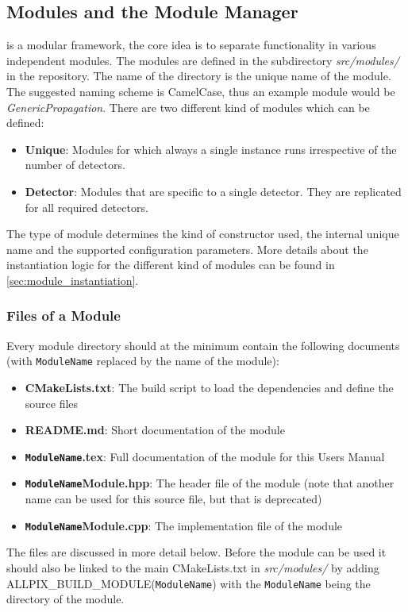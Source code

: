 \subsection{Modules and the Module Manager}
\label{sec:module_manager}
\apsq is a modular framework, the core idea is to separate functionality in various independent modules. The modules are defined in the subdirectory \textit{src/modules/} in the repository. The name of the directory is the unique name of the module. The suggested naming scheme is CamelCase, thus an example module would be \textit{GenericPropagation}. There are two different kind of modules which can be defined:
\begin{itemize}
\item \textbf{Unique}: Modules for which always a single instance runs irrespective of the number of detectors.
\item \textbf{Detector}: Modules that are specific to a single detector. They are replicated for all required detectors.
\end{itemize}
The type of module determines the kind of constructor used, the internal unique name and the supported configuration parameters. More details about the instantiation logic for the different kind of modules can be found in \ref{sec:module_instantiation}.

\subsubsection{Files of a Module}
\label{sec:module_files}
Every module directory should at the minimum contain the following documents (with \texttt{ModuleName} replaced by the name of the module):
\begin{itemize}
\item \textbf{CMakeLists.txt}: The build script to load the dependencies and define the source files
\item \textbf{README.md}: Short documentation of the module
\item \textbf{\texttt{ModuleName}.tex}: Full documentation of the module for this Users Manual
\item \textbf{\texttt{ModuleName}Module.hpp}: The header file of the module (note that another name can be used for this source file, but that is deprecated)
\item \textbf{\texttt{ModuleName}Module.cpp}: The implementation file of the module
\end{itemize}
The files are discussed in more detail below. Before the module can be used it should also be linked to the main CMakeLists.txt in \textit{src/modules/} by adding \\ ALLPIX\_BUILD\_MODULE(\texttt{ModuleName}) with the \texttt{ModuleName} being the directory of the module. 

